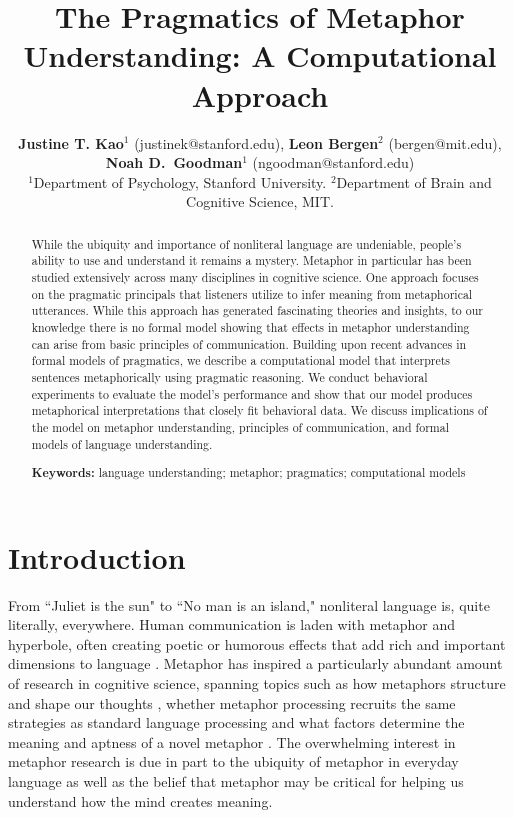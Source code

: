 \documentclass[10pt,letterpaper]{article}
\title{The Pragmatics of Metaphor Understanding: A Computational Approach}
\author{{\large {\bf Justine T. Kao$^1$} (justinek@stanford.edu)}, {\large {\bf Leon Bergen$^2$} (bergen@mit.edu)}, {\large {\bf Noah D.~Goodman$^1$} (ngoodman@stanford.edu)}\\
  $^1$Department of Psychology, Stanford University. $^2$Department of Brain and Cognitive Science, MIT. }
\begin{document}
\maketitle
\begin{abstract}
While the ubiquity and importance of nonliteral language are undeniable, people's ability to use and understand it remains a mystery. Metaphor in particular has been studied extensively across many disciplines in cognitive science. One approach focuses on the pragmatic principals that listeners utilize to infer meaning from metaphorical utterances. While this approach has generated fascinating theories and insights, to our knowledge there is no formal model showing that effects in metaphor understanding can arise from basic principles of communication. Building upon recent advances in formal models of pragmatics, we describe a computational model that interprets sentences metaphorically using pragmatic reasoning. We conduct behavioral experiments to evaluate the model's performance and show that our model produces metaphorical interpretations that closely fit behavioral data. We discuss implications of the model on metaphor understanding, principles of communication, and formal models of language understanding.

\textbf{Keywords:} 
language understanding; metaphor; pragmatics; computational models
\end{abstract}


\section{Introduction}
From ``Juliet is the sun" to ``No man is an island," nonliteral language is, quite literally, everywhere. Human communication is laden with metaphor and hyperbole, often creating poetic or humorous effects that add rich and important dimensions to language \cite{glucksberg2001understanding, pilkington2000poetic, lakoff2009more, roberts1994people}. Metaphor has inspired a particularly abundant amount of research in cognitive science, spanning topics such as how metaphors structure and shape our thoughts \cite{ortony1993metaphor, lakoff1993contemporary, thibodeau2011metaphors}, whether metaphor processing recruits the same strategies as standard language processing \cite{giora1997understanding, gibbs2002new, glucksberg1993metaphors} and what factors determine the meaning and aptness of a novel metaphor \cite{blasko1993effects, tourangeau1981aptness, kintsch2002metaphor}. The overwhelming interest in metaphor research is due in part to the ubiquity of metaphor in everyday language as well as the belief that metaphor may be critical for helping us understand how the mind creates meaning. 
\end{document}
